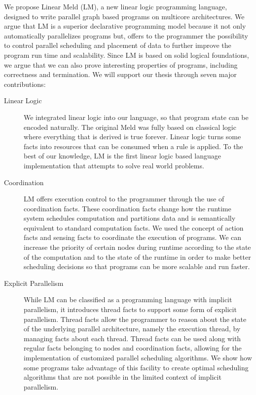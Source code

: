 
We propose Linear Meld (LM), a new linear logic programming language, designed
to write parallel graph based programs on multicore architectures. We argue that
LM is a superior declarative programming model because it not only automatically
parallelizes programs but, offers to the programmer the possibility to control parallel
scheduling and placement of data to further improve the program run time and
scalability.  Since LM is based on solid logical foundations, we argue that we
can also prove interesting properties of programs, including correctness and
termination. We will support our thesis through seven major contributions:

\begin{description}
   
   \item[Linear Logic]

   We integrated linear logic into our language, so that program state can be
   encoded naturally. The original Meld was fully based on classical logic where
   everything that is derived is true forever. Linear logic turns some facts
   into resources that can be consumed when a rule is applied.  To the best of
   our knowledge, LM is the first linear logic based language implementation
   that attempts to solve real world problems.

   \item[Coordination]
   
   LM offers execution control to the programmer through the use of coordination
   facts. These coordination facts change how the runtime system schedules
   computation and partitions data and is semantically equivalent to standard
   computation facts. We used the concept of action facts and sensing facts to
   coordinate the execution of programs. We can increase the priority of certain
   nodes during runtime according to the state of the computation and to the
   state of the runtime in order to make better scheduling decisions so that
   programs can be more scalable and run faster.

   \item[Explicit Parallelism]

   While LM can be classified as a programming language with implicit
   parallelism, it introduces thread facts to support some form of explicit
   parallelism. Thread facts allow the programmer to reason about the state of
   the underlying parallel architecture, namely the execution thread, by
   managing facts about each thread. Thread facts can be used along with regular
   facts belonging to nodes and coordination facts, allowing for the
   implementation of customized parallel scheduling algorithms. We show how some
   programs take advantage of this facility to create optimal scheduling
   algorithms that are not possible in the limited context of implicit
   parallelism.
   

\end{description}
